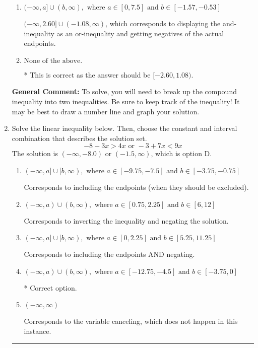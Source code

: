 \documentclass{extbook}[14pt]
\newcommand{\litem}[1]{\item #1

\rule{\textwidth}{0.4pt}}
\begin{document}
\begin{enumerate}
{\begin{enumerate}[label=\Alph*.]
$(-\infty, 2.60) \cup [-1.08, \infty)$, which corresponds to displaying the and-inequality as an or-inequality AND flipping the inequality AND getting negatives of the actual endpoints.
\item \( (-\infty, a] \cup (b, \infty), \text{ where } a \in [0, 7.5] \text{ and } b \in [-1.57, -0.53] \)

$(-\infty, 2.60] \cup (-1.08, \infty)$, which corresponds to displaying the and-inequality as an or-inequality and getting negatives of the actual endpoints.
\item \( \text{None of the above.} \)

* This is correct as the answer should be $[-2.60, 1.08)$.
\end{enumerate}

\textbf{General Comment:} To solve, you will need to break up the compound inequality into two inequalities. Be sure to keep track of the inequality! It may be best to draw a number line and graph your solution.
}
\litem{
Solve the linear inequality below. Then, choose the constant and interval combination that describes the solution set.
\[ -8 + 3 x > 4 x \text{ or } -3 + 7 x < 9 x \]The solution is \( (-\infty, -8.0) \text{ or } (-1.5, \infty) \), which is option D.\begin{enumerate}[label=\Alph*.]
\item \( (-\infty, a] \cup [b, \infty), \text{ where } a \in [-9.75, -7.5] \text{ and } b \in [-3.75, -0.75] \)

Corresponds to including the endpoints (when they should be excluded).
\item \( (-\infty, a) \cup (b, \infty), \text{ where } a \in [0.75, 2.25] \text{ and } b \in [6, 12] \)

Corresponds to inverting the inequality and negating the solution.
\item \( (-\infty, a] \cup [b, \infty), \text{ where } a \in [0, 2.25] \text{ and } b \in [5.25, 11.25] \)

Corresponds to including the endpoints AND negating.
\item \( (-\infty, a) \cup (b, \infty), \text{ where } a \in [-12.75, -4.5] \text{ and } b \in [-3.75, 0] \)

 * Correct option.
\item \( (-\infty, \infty) \)

Corresponds to the variable canceling, which does not happen in this instance.
\end{enumerate}

}
\end{enumerate}
\end{document}
